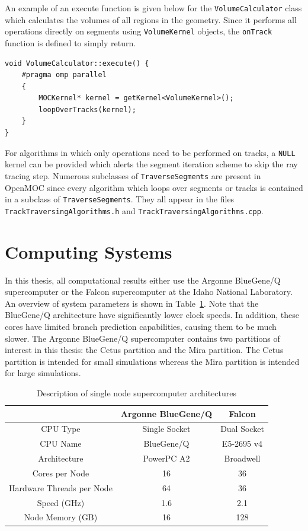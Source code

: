 An example of an execute function is given below for the \texttt{VolumeCalculator} class which calculates the volumes of all regions in the geometry. Since it performs all operations directly on segments using \texttt{VolumeKernel} objects, the \texttt{onTrack} function is defined to simply return.

\begin{center}
\begin{lstlisting}
void VolumeCalculator::execute() {
	#pragma omp parallel
	{
		MOCKernel* kernel = getKernel<VolumeKernel>();
		loopOverTracks(kernel);
	}
}
\end{lstlisting}
\end{center}

For algorithms in which only operations need to be performed on tracks, a \texttt{NULL} kernel can be provided which alerts the segment iteration scheme to skip the ray tracing step. Numerous subclasses of \texttt{TraverseSegments} are present in OpenMOC since every algorithm which loops over segments or tracks is contained in a subclass of \texttt{TraverseSegments}. They all appear in the files \texttt{TrackTraversingAlgorithms.h} and \texttt{TrackTraversingAlgorithms.cpp}.

\section{Computing Systems}
\label{sec:computing-systems}

In this thesis, all computational results either use the Argonne BlueGene/Q supercomputer or the Falcon supercomputer at the Idaho National Laboratory. An overview of system parameters is shown in Table~\ref{tab:system-params}. Note that the BlueGene/Q architecture have significantly lower clock speeds. In addition, these cores have limited branch prediction capabilities, causing them to be much slower. The Argonne BlueGene/Q supercomputer contains two partitions of interest in this thesis: the Cetus partition and the Mira partition. The Cetus partition is intended for small simulations whereas the Mira partition is intended for large simulations.

\begin{table}[ht]
	\centering
	\caption{Description of single node supercomputer architectures}
	\medskip
	\begin{tabular}{c|c|c}
		\hline
		& Argonne BlueGene/Q & Falcon\\
		\hline
		CPU Type & Single Socket & Dual Socket \\
		CPU Name & BlueGene/Q & E5-2695 v4 \\
		Architecture & PowerPC A2 & Broadwell\\
		Cores per Node & 16 & 36\\
		Hardware Threads per Node & 64 & 36\\
		Speed (GHz) & 1.6 & 2.1\\
		Node Memory (GB) & 16 & 128 \\
		\hline
	\end{tabular}
	\label{tab:system-params}
\end{table}

